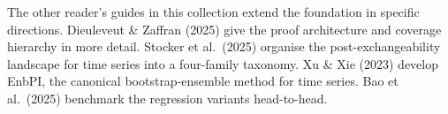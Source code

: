 \documentclass[letterpaper,11pt,leqno]{article}
\newcommand{\bib}{paper.bib}
\begin{document}
The other reader's guides in this collection extend the foundation in specific directions. Dieuleveut \& Zaffran (2025) give the proof architecture and coverage hierarchy in more detail. Stocker et al.~(2025) organise the post-exchangeability landscape for time series into a four-family taxonomy. Xu \& Xie (2023) develop EnbPI, the canonical bootstrap-ensemble method for time series. Bao et al.~(2025) benchmark the regression variants head-to-head.


\end{document}
